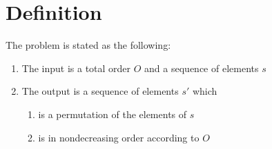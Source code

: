 \section{Definition}
\label{tree:sorting:def}

The problem is stated as the following:

\begin{enumerate}
\item The input is a total order $O$ and a sequence of elements $s$
\item The output is a sequence of elements $s'$ which
	\begin{enumerate}
	\item is a permutation of the elements of $s$
	\item is in nondecreasing order according to $O$
	\end{enumerate}
\end{enumerate}

